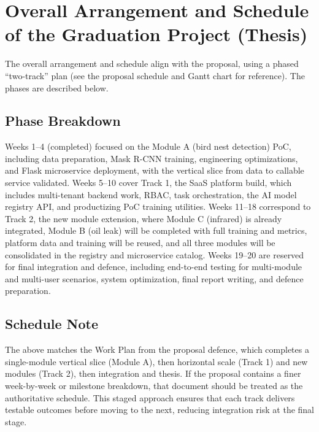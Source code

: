 \documentclass[12pt,a4paper]{article}
\begin{document}
\section{Overall Arrangement and Schedule of the Graduation Project (Thesis)}

The overall arrangement and schedule align with the proposal, using a phased ``two-track'' plan (see the proposal schedule and Gantt chart for reference). The phases are described below.

\subsection{Phase Breakdown}

Weeks 1--4 (completed) focused on the Module A (bird nest detection) PoC, including data preparation, Mask R-CNN training, engineering optimizations, and Flask microservice deployment, with the vertical slice from data to callable service validated. Weeks 5--10 cover Track 1, the SaaS platform build, which includes multi-tenant backend work, RBAC, task orchestration, the AI model registry API, and productizing PoC training utilities. Weeks 11--18 correspond to Track 2, the new module extension, where Module C (infrared) is already integrated, Module B (oil leak) will be completed with full training and metrics, platform data and training will be reused, and all three modules will be consolidated in the registry and microservice catalog. Weeks 19--20 are reserved for final integration and defence, including end-to-end testing for multi-module and multi-user scenarios, system optimization, final report writing, and defence preparation.

\subsection{Schedule Note}

The above matches the Work Plan from the proposal defence, which completes a single-module vertical slice (Module A), then horizontal scale (Track 1) and new modules (Track 2), then integration and thesis. If the proposal contains a finer week-by-week or milestone breakdown, that document should be treated as the authoritative schedule. This staged approach ensures that each track delivers testable outcomes before moving to the next, reducing integration risk at the final stage.

\end{document}
